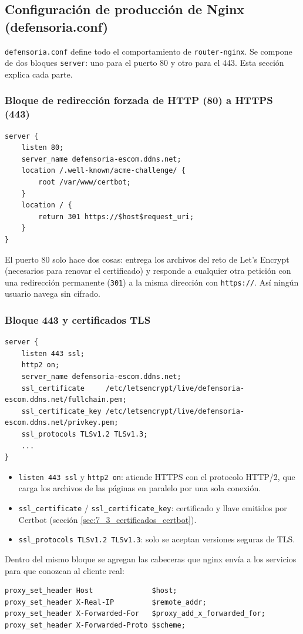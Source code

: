 \subsection{Configuración de producción de Nginx (defensoria.conf)}\label{sec:7_4_defensoria_conf}
\texttt{defensoria.conf} define todo el comportamiento de \texttt{router-nginx}. Se compone de dos bloques \texttt{server}: uno para el puerto 80 y otro para el 443. Esta sección explica cada parte.

\subsubsection{Bloque de redirección forzada de HTTP (80) a HTTPS (443)}
\begin{lstlisting}
server {
    listen 80;
    server_name defensoria-escom.ddns.net;
    location /.well-known/acme-challenge/ {
        root /var/www/certbot;
    }
    location / {
        return 301 https://$host$request_uri;
    }
}
\end{lstlisting}
El puerto 80 solo hace dos cosas: entrega los archivos del reto de Let's Encrypt (necesarios para renovar el certificado) y responde a cualquier otra petición con una redirección permanente (\texttt{301}) a la misma dirección con \texttt{https://}. Así ningún usuario navega sin cifrado.

\subsubsection{Bloque 443 y certificados TLS}
\begin{lstlisting}
server {
    listen 443 ssl;
    http2 on;
    server_name defensoria-escom.ddns.net;
    ssl_certificate     /etc/letsencrypt/live/defensoria-escom.ddns.net/fullchain.pem;
    ssl_certificate_key /etc/letsencrypt/live/defensoria-escom.ddns.net/privkey.pem;
    ssl_protocols TLSv1.2 TLSv1.3;
    ...
}
\end{lstlisting}
\begin{itemize}
  \item \texttt{listen 443 ssl} y \texttt{http2 on}: atiende HTTPS con el protocolo HTTP/2, que carga los archivos de las páginas en paralelo por una sola conexión.
  \item \texttt{ssl\_certificate} / \texttt{ssl\_certificate\_key}: certificado y llave emitidos por Certbot (sección \ref{sec:7_3_certificados_certbot}).
  \item \texttt{ssl\_protocols TLSv1.2 TLSv1.3}: solo se aceptan versiones seguras de TLS.
\end{itemize}
Dentro del mismo bloque se agregan las cabeceras que nginx envía a los servicios para que conozcan al cliente real:
\begin{lstlisting}
proxy_set_header Host              $host;
proxy_set_header X-Real-IP         $remote_addr;
proxy_set_header X-Forwarded-For   $proxy_add_x_forwarded_for;
proxy_set_header X-Forwarded-Proto $scheme;
\end{lstlisting}

